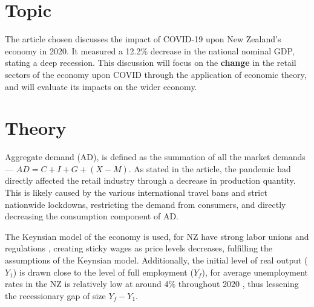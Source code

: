 \documentclass[a4paper,12pt]{article}
\begin{document}




\section*{Topic}
The article chosen discusses the impact of COVID-19 upon New Zealand's economy in 2020. It  measured a 12.2\% decrease in the national nominal GDP, stating a deep recession. This discussion will focus on the \textbf{change} in the retail sectors of the economy upon COVID through the application of economic theory, and will evaluate its impacts on the wider economy.

\section*{Theory}
Aggregate demand (AD), is defined as the summation of all the market demands --- $AD = C+I+G+(X-M)$. As stated in the article, the pandemic had directly affected the retail industry through a decrease in production quantity. This is likely caused by the various international travel bans and strict nationwide lockdowns, restricting the demand from consumers, and directly decreasing the consumption component of AD.

The Keynsian model of the economy is used, for NZ have strong labor unions and regulations \parencite{labor}, creating sticky wages as price levels decreases, fulfilling the assumptions of the Keynsian model. Additionally, the initial level of real output ($Y_1$) is drawn close to the level of full employment ($Y_f$), for average unemployment rates in the NZ is relatively low at around 4\% throughout 2020 \parencite{unemploy}, thus lessening the recessionary gap of size $Y_f-Y_1$.
\end{document}
